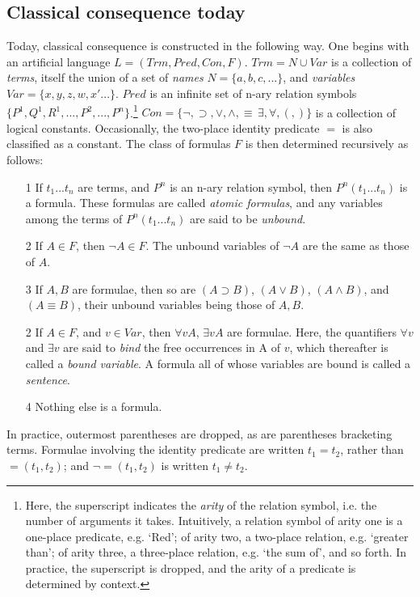 \documentclass[]{article}
\begin{document}
\subsection{Classical consequence today}
Today, classical consequence is constructed in the following way. One begins with an artificial language $L = (Trm, Pred, Con, F)$. $Trm = N \cup Var$ is a collection of \textit{terms}, itself the union of a set of \textit{names} $N = \{a, b, c, ...\}$, and \textit{variables} $Var = \{x, y, z, w, x'...\}$. $Pred$ is an infinite set of n-ary relation symbols $\{P^{1}, Q^{1}, R^{1},..., P^{2},..., P^{n}\}$.\footnote{Here, the superscript indicates the \textit{arity} of the relation symbol, i.e. the number of arguments it takes. Intuitively, a relation symbol of arity one is a one-place predicate, e.g. `Red'; of arity two, a two-place relation, e.g. `greater than'; of arity three, a three-place relation, e.g. `the sum of', and so forth. In practice, the superscript is dropped, and the arity of a predicate is determined by context.} $Con = \{\neg, \supset, \vee, \wedge, \equiv\, \exists, \forall, (, )\}$ is a collection of logical constants. Occasionally, the two-place identity predicate $=$ is also classified as a constant. The class of formulas $F$ is then determined recursively as follows:
\begin{itemize}
\item[1] If $t_{1} ... t_{n}$ are terms, and $P^{n}$ is an n-ary relation symbol, then $P^{n}(t_{1} ... t_{n})$ is a formula. These formulas are called \textit{atomic formulas}, and any variables among the terms of $P^{n}(t_{1} ... t_{n})$ are said to be \textit{unbound}.
\item[2] If $A \in F$, then $\neg A \in F$. The unbound variables of $\neg A$ are the same as those of $A$.
\item[3] If $A, B$ are formulae, then so are $(A \supset B)$, $(A \vee B)$, $(A \wedge B)$, and $(A \equiv B)$, their unbound variables being those of $A, B$.
\item[2] If $A \in F$, and $v \in Var$, then $\forall v A$, $\exists v A$ are formulae. Here, the quantifiers $\forall v$ and $\exists v$ are said to \textit{bind} the free occurrences in A of $v$, which thereafter is called a \textit{bound variable}. A formula all of whose variables are bound is called a \textit{sentence}.
\item[4] Nothing else is a formula.
\end{itemize}
In practice, outermost parentheses are dropped, as are parentheses bracketing terms. Formulae involving the identity predicate are written $t_{1} = t_{2}$, rather than $=(t_{1}, t_{2})$; and $\neg=(t_{1}, t_{2})$ is written $t_{1} \ne t_{2}$.
\end{document}
